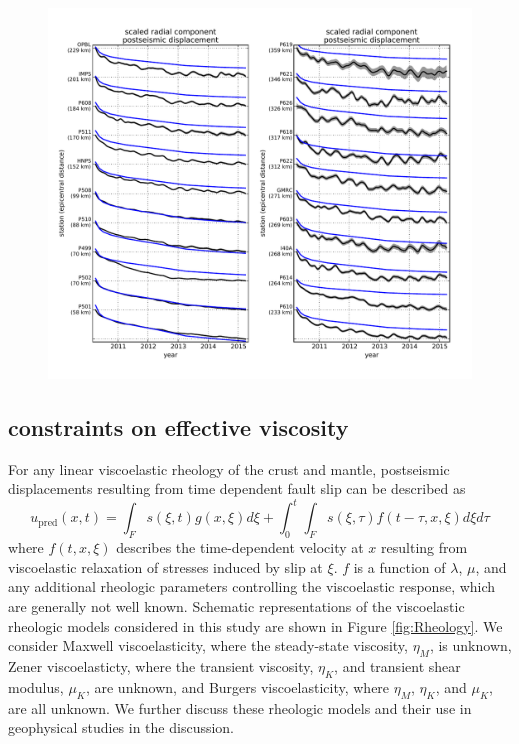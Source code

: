 \documentclass[review]{elsarticle}
\begin{document}
\begin{figure}
\includegraphics[scale=0.7]{Figures/RecordSectionElastic}
\caption{}
\label{fig:RecordSectionElastic}
\end{figure}

\subsection{constraints on effective viscosity}\label{sec:InitialInversion}


For any linear viscoelastic rheology of the crust and mantle, postseismic displacements resulting from time dependent fault slip can be described as  
\begin{equation}\label{GeneralForward}
  u_\mathrm{pred}(x,t) = \int_F s(\xi,t)g(x,\xi)d\xi + 
           \int_0^t\int_F s(\xi,\tau) f(t-\tau,x,\xi) d\xi d\tau
\end{equation}
where $f(t,x,\xi)$ describes the time-dependent velocity at $x$ resulting from viscoelastic relaxation of stresses induced by slip at $\xi$. $f$ is a function of $\lambda$, $\mu$, and any additional rheologic parameters controlling the viscoelastic response, which are generally not well known. Schematic representations of the viscoelastic rheologic models considered in this study are shown in Figure \ref{fig:Rheology}.  We consider Maxwell viscoelasticity, where the steady-state viscosity, $\eta_M$, is unknown, Zener viscoelasticty, where the transient viscosity, $\eta_K$, and transient shear modulus, $\mu_K$, are unknown, and Burgers viscoelasticity, where $\eta_M$, $\eta_K$, and $\mu_K$, are all unknown. We further discuss these rheologic models and their use in geophysical studies in the discussion. 
\end{document}

